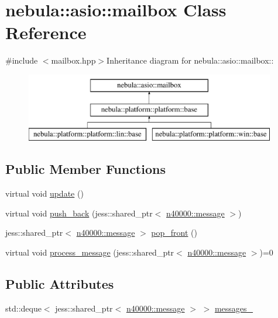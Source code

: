 \hypertarget{classnebula_1_1asio_1_1mailbox}{
\section{nebula::asio::mailbox Class Reference}
\label{classnebula_1_1asio_1_1mailbox}
}


{\ttfamily \#include $<$mailbox.hpp$>$}Inheritance diagram for nebula::asio::mailbox::\begin{figure}[H]
\begin{center}
\leavevmode
\includegraphics[height=3cm]{classnebula_1_1asio_1_1mailbox}
\end{center}
\end{figure}
\subsection*{Public Member Functions}
\begin{DoxyCompactItemize}
\item 
virtual void \hyperlink{classnebula_1_1asio_1_1mailbox_afee466b6e97ee4116768479dd8337d98}{update} ()
\item 
virtual void \hyperlink{classnebula_1_1asio_1_1mailbox_a60f52209d59c3ebff7a16b9bd8efe164}{push\_\-back} (jess::shared\_\-ptr$<$ \hyperlink{classnebula_1_1asio_1_1message}{n40000::message} $>$)
\item 
jess::shared\_\-ptr$<$ \hyperlink{classnebula_1_1asio_1_1message}{n40000::message} $>$ \hyperlink{classnebula_1_1asio_1_1mailbox_a8e39cb9de42410b472c10ab84ec930b1}{pop\_\-front} ()
\item 
virtual void \hyperlink{classnebula_1_1asio_1_1mailbox_a3377065a87912ef3a72108cf88549c11}{process\_\-message} (jess::shared\_\-ptr$<$ \hyperlink{classnebula_1_1asio_1_1message}{n40000::message} $>$)=0
\end{DoxyCompactItemize}
\subsection*{Public Attributes}
\begin{DoxyCompactItemize}
\item 
std::deque$<$ jess::shared\_\-ptr$<$ \hyperlink{classnebula_1_1asio_1_1message}{n40000::message} $>$ $>$ \hyperlink{classnebula_1_1asio_1_1mailbox_aa0919868c860545e0f123065df043e2f}{messages\_\-}
\end{DoxyCompactItemize}


